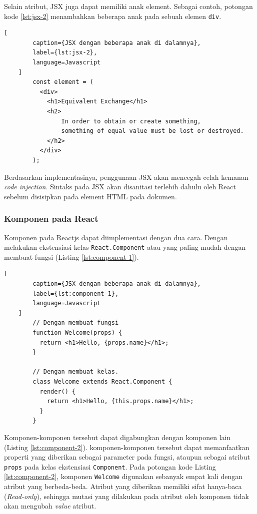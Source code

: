         
    Selain atribut, JSX juga dapat memiliki anak element. Sebagai contoh, potongan kode \ref{lst:jsx-2} menambahkan beberapa anak pada sebuah elemen \texttt{div}.
    \begin{lstlisting}[
        caption={JSX dengan beberapa anak di dalamnya}, 
        label={lst:jsx-2}, 
        language=Javascript
    ]
        const element = (
          <div>
            <h1>Equivalent Exchange</h1>
            <h2>
                In order to obtain or create something,
                something of equal value must be lost or destroyed.
            </h2>
          </div>
        );
    \end{lstlisting}
    
    Berdasarkan implementasinya, penggunaan JSX akan mencegah celah kemanan \textit{code injection}. Sintaks pada JSX akan disanitasi terlebih dahulu oleh React sebelum disisipkan pada element HTML pada dokumen.
    
    \subsubsection{Komponen pada React}
    Komponen pada Reactjs dapat diimplementasi dengan dua cara. Dengan melakukan ekstensiasi kelas \texttt{React.Component} atau yang paling mudah dengan membuat fungsi (Listing \ref{lst:component-1}).
    
    \begin{lstlisting}[
        caption={JSX dengan beberapa anak di dalamnya}, 
        label={lst:component-1}, 
        language=Javascript
    ]
        // Dengan membuat fungsi
        function Welcome(props) {
          return <h1>Hello, {props.name}</h1>;
        }
        
        // Dengan membuat kelas.
        class Welcome extends React.Component {
          render() {
            return <h1>Hello, {this.props.name}</h1>;
          }
        }
    \end{lstlisting}
    
    Komponen-komponen tersebut dapat digabungkan dengan komponen lain (Listing \ref{lst:component-2}). komponen-komponen tersebut dapat memanfaatkan properti yang diberikan sebagai parameter pada fungsi, ataupun sebagai atribut \texttt{props} pada kelas ekstensiasi \texttt{Component}. Pada potongan kode Listing \ref{lst:component-2}, komponen \texttt{Welcome} digunakan sebanyak empat kali dengan atribut yang berbeda-beda.
    Atribut yang diberikan memiliki sifat hanya-baca (\textit{Read-only}), sehingga mutasi yang dilakukan pada atribut oleh komponen tidak akan mengubah \textit{value} atribut.
    

